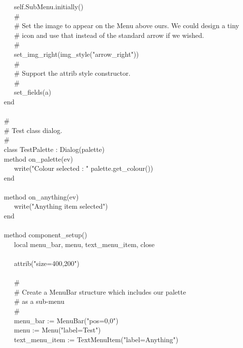 {\>   \ \ \ self.SubMenu.initially() \\
\>   \ \ \ \# \\
\>   \ \ \ \# Set the image to appear on the Menu above ours. We could design a tiny \\
\>   \ \ \ \# icon and use that instead of the standard arrow if we wished. \\
\>   \ \ \ \#  \\
\>   \ \ \ set\_img\_right(img\_style("arrow\_right")) \\
\>   \ \ \ \# \\
\>   \ \ \ \# Support the attrib style constructor. \\
\>   \ \ \ \# \\
\>   \ \ \ set\_fields(a) \\
end \\
\ \\
\# \\
\# Test class dialog. \\
\# \\
class TestPalette : Dialog(palette) \\
\>   method on\_palette(ev) \\
\>   \ \ \ write("Colour selected : "
{\textbar}{\textbar} palette.get\_colour()) \\
\>   end \\
\ \\
\>   method on\_anything(ev) \\
\>   \ \ \ write("Anything item selected") \\
\>   end \\
\ \\
\>   method component\_setup() \\
\>   \ \ \ local menu\_bar, menu, text\_menu\_item, close \\
\ \\
\>   \ \ \ attrib("size=400,200") \\
\ \\
\>   \ \ \ \# \\
\>   \ \ \ \# Create a MenuBar structure which includes our palette  \\
\>   \ \ \ \# as a sub-menu \\
\>   \ \ \ \# \\
\>   \ \ \ menu\_bar := MenuBar("pos=0,0") \\
\>   \ \ \ menu := Menu("label=Test") \\
\>   \ \ \ text\_menu\_item :=
TextMenuItem("label=Anything") \\
}
